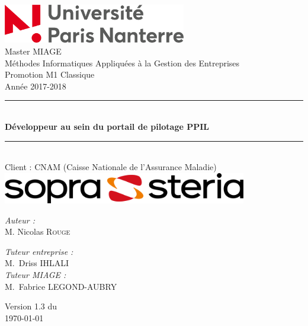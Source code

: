 \documentclass[a4paper,12pt]{book}
\theoremstyle{break}
\begin{document}

\begin{titlepage}
\begin{center}

\includegraphics[width=0.6\textwidth]{logo_parisNanterre.png}\\[1cm]
{\large Master MIAGE}\\[0.5cm]
{\large Méthodes Informatiques Appliquées à la Gestion des Entreprises}\\[0.5cm]
{\large Promotion M1 Classique}\\[0.5cm]
{\large Année 2017-2018}\\[0.5cm]

\rule{\linewidth}{0.5mm} \\[0.4cm]
{ \huge \bfseries  Développeur au sein du portail de pilotage PPIL\\[0.4cm] }
\rule{\linewidth}{0.5mm} \\[1.5cm]
{\large Client : CNAM (Caisse Nationale de l'Assurance Maladie)}\\[0.5cm]
\includegraphics[width=0.8\textwidth]{logo-soprasteria-2.png}\\[1cm]
\noindent
\begin{minipage}{0.4\textwidth}
  \begin{flushleft} \large
    \emph{Auteur :}\\
    M. Nicolas \textsc{Rouge}\\
  \end{flushleft}
\end{minipage}%
\begin{minipage}{0.6\textwidth}
  \begin{flushright} \large
    \emph{Tuteur entreprise :} \\
    M.~Driss \textsc{IHLALI}\\
    \emph{Tuteur MIAGE :} \\
    M.~Fabrice \textsc{LEGOND-AUBRY}
  \end{flushright}
\end{minipage}

\vfill

{\large Version 1.3 du\\ \today}

\end{center}
\end{titlepage}
\end{document}
